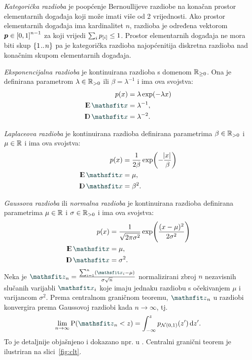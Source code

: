 \documentclass[utf8, diplomski, lmodern]{fer}
\begin{document}
\emph{Kategorička razdioba} je poopćenje Bernoullijeve razdiobe na konačan prostor elementarnih događaja koji može imati više od 2 vrijednosti. Ako prostor elementarnih događaja ima kardinalitet $n$, razdioba je određena vektorom $\vec p\in\intcc{0,1}^{n-1}$ za koji vrijedi $\sum_i p_{\sbr{i}}\leq 1$. Prostor elementarnih događaja ne mora biti skup $\cbr{1\bidot n}$ pa je kategorička razdioba najopćenitija diskretna razdioba nad konačnim skupom elementarnih događaja.

\emph{Eksponencijalna razdioba} je kontinuirana razdioba s domenom $\mathbb{R}_{\geq0}$. Ona je definirana parametrom $\lambda\in\mathbb{R}_{>0}$ ili $\beta=\lambda^{-1}$ i ima ova svojstva:
\begin{align}
p(x) &=  \lambda\exp(-\lambda x) \\
\E \rvar x &= \lambda^{-1}, \\
\D \rvar x &= \lambda^{-2}.
\end{align}

\emph{Laplaceova razdioba} je kontinuirana razdioba definirana parametrima $\beta\in\mathbb{R}_{>0}$ i $\mu \in \mathbb{R}$ i ima ova svojstva:
\begin{align}
p(x) &= \frac{1}{2\beta}\exp\del{-\frac{\envert{x}}{\beta}} \\
\E \rvar x &= \mu, \\
\D \rvar x &= \beta^2.
\end{align}

\emph{Gaussova razdioba} ili \emph{normalna razdioba} je kontinuirana razdioba definirana parametrima $\mu\in\mathbb{R}$ i $\sigma \in \mathbb{R}_{>0}$ i ima ova svojstva:
\begin{align}
p(x) &=  \frac{1}{\sqrt{2\pi\sigma^2}}\exp\del{\frac{\del{x-\mu}^2}{2\sigma^2}} \\
\E \rvar x &= \mu, \\
\D \rvar x &= \sigma^2.
\end{align}
Neka je $\rvar z_n = \frac{\sum_{i=1}^n \del{\rvar x_i-\mu}}{\sigma\sqrt{n}}$ normalizirani zbroj $n$ nezavisnih slučanih varijabli $\rvar x_i$ koje imaju jednaku razdiobu s očekivanjem $\mu$ i varijancom $\sigma^2$. Prema centralnom graničnom teoremu, $\rvar z_n$ u razdiobi konvergira prema Gaussovoj razdiobi kada $n\to\infty$, tj.
\begin{align}
\lim_{n\to\infty} \P(\rvar z_n<z) = \int_{-\infty}^{z} p_{\mathcal{N}(0,1)}(z')\dif{z'}.
\end{align}
To je detaljnije objašnjeno i dokazano npr. u \citep{Elezovic:2007:VSSV}. Centralni granični teorem je ilustriran na slici~\ref{fig:clt}.
\end{document}
